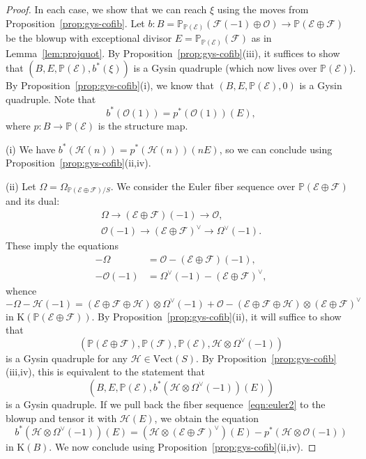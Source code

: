 \documentclass{amsart}
\numberwithin{equation}{section}
\theoremstyle{plain}
\theoremstyle{definition}
\newtheorem{remark}[equation]{Remark}
\let\scr=\mathcal
\let\bb=\mathbb
\def\Z{\bb Z}
\def\P{\bb P}
\let\cat=\mathrm
\def\K{\mathrm{K}{}}
\def\Vect{\cat{V}\mathrm{ect}{}}
\begin{document}

\begin{proof}
	In each case, we show that we can reach $\xi$ using the moves from Proposition~\ref{prop:gys-cofib}. Let $b\colon B=\P_{\P(\scr E)}(\scr F(-1)\oplus\scr O)\to\P(\scr E\oplus\scr F)$ be the blowup with exceptional divisor $E=\P_{\P(\scr E)}(\scr F)$ as in Lemma~\ref{lem:projquot}. By Proposition~\ref{prop:gys-cofib}(iii), it suffices to show that $(B,E,\P(\scr E),b^*(\xi))$ is a Gysin quadruple (which now lives over $\P(\scr E)$). By Proposition~\ref{prop:gys-cofib}(i), we know that $(B,E,\P(\scr E),0)$ is a Gysin quadruple.
		Note that \[b^*(\scr O(1))=p^*(\scr O(1))(E),\] 
		where $p\colon B\to \P(\scr E)$ is the structure map.
	
	(i) We have $b^*(\scr H(n))=p^*(\scr H(n))(nE)$, so we can conclude using Proposition~\ref{prop:gys-cofib}(ii,iv).
	
	(ii) Let $\Omega=\Omega_{\P(\scr E\oplus\scr F)/S}$. We consider the Euler fiber sequence over $\P(\scr E\oplus\scr F)$ and its dual:
	\begin{gather}
		\label{eqn:euler1}\Omega\to (\scr E\oplus\scr F)(-1) \to\scr O,\\
		\label{eqn:euler2}\scr O(-1) \to (\scr E\oplus\scr F)^\vee \to \Omega^\vee(-1).
	\end{gather}
	These imply the equations
	\begin{align*}
	-\Omega &= \scr O-(\scr E\oplus\scr F)(-1),\\
	 -\scr O(-1) &= \Omega^\vee(-1)-(\scr E\oplus\scr F)^\vee,
	\end{align*}
	whence
	\[
	-\Omega-\scr H(-1) = (\scr E\oplus\scr F\oplus\scr H)\otimes \Omega^\vee(-1)+\scr O-(\scr E\oplus\scr F\oplus\scr H)\otimes(\scr E\oplus\scr F)^\vee
	\]
	in $\K(\P(\scr E \oplus\scr F))$. By Proposition~\ref{prop:gys-cofib}(ii), it will suffice to show that \[(\P(\scr E\oplus\scr F),\P(\scr F),\P(\scr E),\scr H\otimes\Omega^\vee(-1))\] is a Gysin quadruple for any $\scr H\in\Vect(S)$. By Proposition~\ref{prop:gys-cofib}(iii,iv), this is equivalent to the statement that \[(B,E,\P(\scr E),b^*(\scr H\otimes\Omega^\vee(-1))(E))\] is a Gysin quadruple.
	If we pull back the fiber sequence~\eqref{eqn:euler2} to the blowup and tensor it with $\scr H(E)$, we obtain the equation
	\[
	b^*(\scr H\otimes \Omega^\vee(-1))(E)=(\scr H\otimes (\scr E\oplus\scr F)^\vee)(E)-p^*(\scr H\otimes \scr O(-1))
	\]
	in $\K(B)$. We now conclude using Proposition~\ref{prop:gys-cofib}(ii,iv).
\end{proof}
\end{document}
